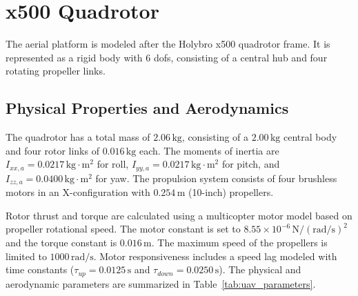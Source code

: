 \section{x500 Quadrotor}
\label{sec:uav_model}

The aerial platform is modeled after the Holybro x500 quadrotor frame. It is represented as a rigid body with 6 \glspl{dof}, consisting of a central hub and four rotating propeller links.

    \subsection{Physical Properties and Aerodynamics}
    The quadrotor has a total mass of $2.06\,\text{kg}$, consisting of a $2.00\,\text{kg}$ central body and four rotor links of $0.016\,\text{kg}$ each. The moments of inertia are $I_{xx,a} = 0.0217\,\text{kg}\cdot\text{m}^2$ for roll, $I_{yy,a} = 0.0217\,\text{kg}\cdot\text{m}^2$ for pitch, and $I_{zz,a} = 0.0400\,\text{kg}\cdot\text{m}^2$ for yaw. The propulsion system consists of four brushless motors in an X-configuration with $0.254\,\text{m}$ (10-inch) propellers.
    
    Rotor thrust and torque are calculated using a multicopter motor model based on propeller rotational speed. The motor constant is set to $8.55 \times 10^{-6}\,\text{N}/(\text{rad/s})^2$ and the torque constant is $0.016\,\text{m}$. The maximum speed of the propellers is limited to $1000\,\text{rad/s}$. Motor responsiveness includes a speed lag modeled with time constants ($\tau_{up} = 0.0125\,\text{s}$ and $\tau_{down} = 0.0250\,\text{s}$). The physical and aerodynamic parameters are summarized in Table~\ref{tab:uav_parameters}.

